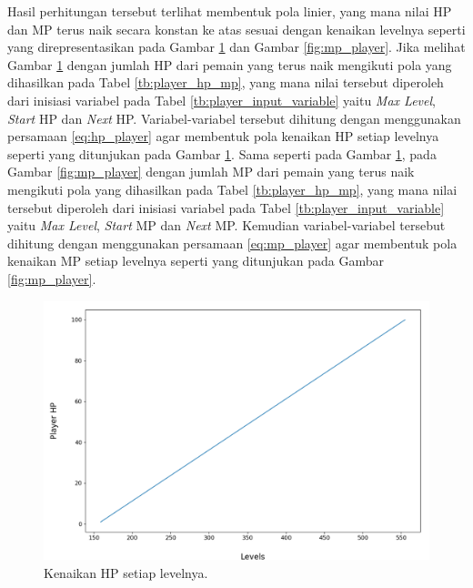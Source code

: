 Hasil perhitungan tersebut terlihat membentuk pola linier, yang mana nilai HP dan MP terus naik secara konstan ke atas sesuai dengan kenaikan levelnya seperti yang direpresentasikan pada Gambar \ref{fig:hp_player} dan Gambar \ref{fig:mp_player}. Jika melihat Gambar \ref{fig:hp_player} dengan jumlah HP dari pemain yang terus naik mengikuti pola yang dihasilkan pada Tabel \ref{tb:player_hp_mp}, yang mana nilai tersebut diperoleh dari inisiasi variabel pada Tabel \ref{tb:player_input_variable} yaitu \textit{Max Level}, \textit{Start} HP dan \textit{Next} HP. Variabel-variabel tersebut dihitung dengan menggunakan persamaan \ref{eq:hp_player} agar membentuk pola kenaikan HP setiap levelnya seperti yang ditunjukan pada Gambar \ref{fig:hp_player}. Sama seperti pada Gambar \ref{fig:hp_player}, pada Gambar \ref{fig:mp_player} dengan jumlah MP dari pemain yang terus naik mengikuti pola yang dihasilkan pada Tabel \ref{tb:player_hp_mp}, yang mana nilai tersebut diperoleh dari inisiasi variabel pada Tabel \ref{tb:player_input_variable} yaitu \textit{Max Level}, \textit{Start} MP dan \textit{Next} MP. Kemudian variabel-variabel tersebut dihitung dengan menggunakan persamaan \ref{eq:mp_player} agar membentuk pola kenaikan MP setiap levelnya seperti yang ditunjukan pada Gambar \ref{fig:mp_player}. 
\vspace{1ex}

\begin{figure} [!h] \centering
	\includegraphics[scale=0.44]{img/PlayerHpDistrib.png}
	\caption{Kenaikan HP setiap levelnya.}
	\label{fig:hp_player}
\end{figure}

